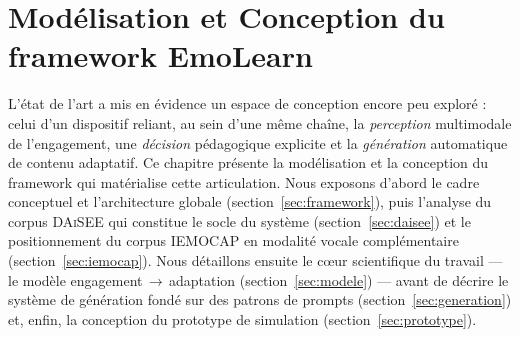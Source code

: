 
\chapter{Modélisation et Conception du framework EmoLearn}
\label{chap:conception}
\minitoc

\par L'état de l'art a mis en évidence un espace de conception encore peu exploré :
celui d'un dispositif reliant, au sein d'une même chaîne, la \emph{perception}
multimodale de l'engagement, une \emph{décision} pédagogique explicite et la
\emph{génération} automatique de contenu adaptatif. Ce chapitre présente la
modélisation et la conception du framework \emolearn{} qui matérialise cette
articulation. Nous exposons d'abord le cadre conceptuel et l'architecture
globale (section~\ref{sec:framework}), puis l'analyse du corpus \textsc{DAiSEE}
qui constitue le socle du système (section~\ref{sec:daisee}) et le positionnement
du corpus \textsc{IEMOCAP} en modalité vocale complémentaire
(section~\ref{sec:iemocap}). Nous détaillons ensuite le c\oe ur scientifique du travail — le modèle
engagement\,$\rightarrow$\,adaptation (section~\ref{sec:modele}) — avant de
décrire le système de génération fondé sur des patrons de prompts
(section~\ref{sec:generation}) et, enfin, la conception du prototype de
simulation (section~\ref{sec:prototype}).

